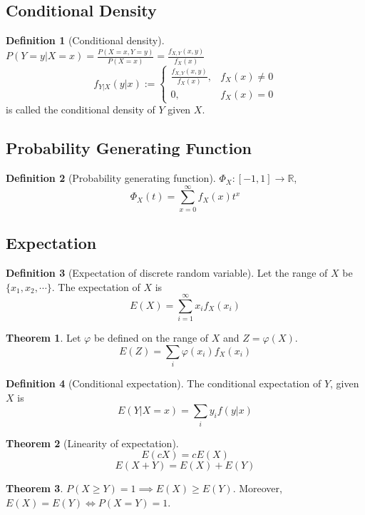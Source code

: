 \documentclass[10pt, a4paper]{extarticle}
\theoremstyle{definition}
\newtheorem{thm}{Theorem}
\newtheorem{defn}{Definition}
\begin{document}
\subsection{Conditional Density}
\begin{defn}[Conditional density]
	$P(Y=y|X=x)=\frac{P(X=x,Y=y)}{P(X=x)}=\frac{f_{X,Y}(x,y)}{f_X(x)}$
	\[f_{Y|X}(y|x):=
		\begin{cases}
			\frac{f_{X,Y}(x,y)}{f_X(x)}, & f_X(x)\neq 0 \\
			0,                           & f_X(x)=0
		\end{cases}
	\]
	is called the conditional density of $Y$ given $X$.
\end{defn}

\subsection{Probability Generating Function}
\begin{defn}[Probability generating function]
	$\Phi_X:[-1,1]\to\mathbb{R}$,
	\[\Phi_X(t)=\sum_{x=0}^\infty f_X(x)t^x\]
\end{defn}

\subsection{Expectation}
\begin{defn}[Expectation of discrete random variable]
	Let the range of $X$ be $\{x_1,x_2,\cdots\}$. The expectation of $X$ is
	\[E(X)=\sum_{i=1}^\infty x_if_X(x_i)\]
\end{defn}

\begin{thm}
	Let $\varphi$ be defined on the range of $X$ and $Z=\varphi(X)$.
	\[E(Z)=\sum_{i}\varphi(x_i)f_X(x_i)\]
\end{thm}

\begin{defn}[Conditional expectation]
	The conditional expectation of $Y$, given $X$ is
	\[E(Y|X=x)=\sum_iy_if(y|x)\]
\end{defn}

\begin{thm}[Linearity of expectation]
	\[E(cX)=cE(X)\]\[E(X+Y)=E(X)+E(Y)\]
\end{thm}


\begin{thm}
	$P(X\geq Y)=1\implies E(X)\geq E(Y)$. Moreover, $E(X)=E(Y)\iff P(X=Y)=1$.
\end{thm}
\end{document}
